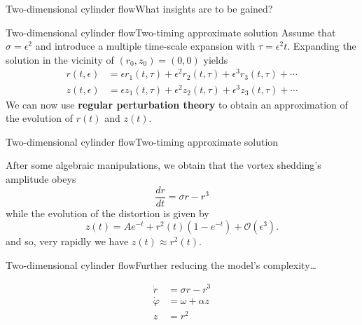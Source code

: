 \documentclass[usenames,dvipsnames,svgnames,10pt,aspectratio=169]{beamer}
\begin{document}
\begin{frame}[t, c]{Two-dimensional cylinder flow}{What insights are to be gained?}
  
\end{frame}



\begin{frame}[t, c]{Two-dimensional cylinder flow}{Two-timing approximate solution}
  Assume that $\sigma = \epsilon^2$ and introduce a multiple time-scale expansion with $\tau = \epsilon^2 t$.
  Expanding the solution in the vicinity of $(r_0, z_0) = (0, 0)$ yields
  \[
  \begin{aligned}
    r(t, \epsilon) & = \epsilon r_1(t, \tau) + \epsilon^2 r_2(t, \tau) + \epsilon^3 r_3(t, \tau) + \cdots \\
    z(t, \epsilon) & = \epsilon z_1(t, \tau) + \epsilon^2 z_2(t, \tau) + \epsilon^3 z_3(t, \tau) + \cdots
  \end{aligned}
  \]
  We can now use \alert{\textbf{regular perturbation theory}} to obtain an approximation of the evolution of $r(t)$ and $z(t)$.
\end{frame}




\begin{frame}[t, c]{Two-dimensional cylinder flow}{Two-timing approximate solution}
  \begin{minipage}{.68\textwidth}
    After some algebraic manipulations, we obtain that the vortex shedding's amplitude obeys
    \[
    \dfrac{dr}{dt} = \sigma  r - r^3
    \]
    while the evolution of the distortion is given by
    \[
    z(t) = A e^{-t} + r^2(t) \left(1 - e^{-t}\right) + \mathcal{O}(\epsilon^3).
    \]
    and so, very rapidly we have $z(t) \approx r^2(t)$.
  \end{minipage}%
  \hfill
  \begin{minipage}{.28\textwidth}
  \end{minipage}
\end{frame}




\begin{frame}[t, c]{Two-dimensional cylinder flow}{Further reducing the model's complexity\ldots}
  \begin{minipage}{.48\textwidth}
    \[
    \begin{aligned}
      \dot{r} & = \sigma r - r^3 \\
    \dot{\varphi} & = \omega + \alpha z \\
    z & = r^2
    \end{aligned}
    \]
  \end{minipage}%
  \hfill
  \begin{minipage}{.48\textwidth}

  \end{minipage}
\end{frame}
\end{document}
